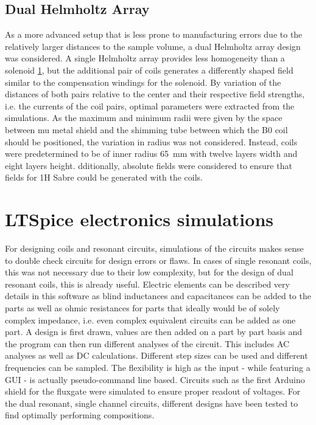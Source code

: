         \subsection{Dual Helmholtz Array}\label{simulations:DualHelmholtzArray}
        As a more advanced setup that is less prone to manufacturing errors due to the relatively larger distances to the sample volume, a dual Helmholtz array design was considered. A single Helmholtz array provides less homogeneity than a solenoid \ref{}, but the additional pair of coils generates a differently shaped field similar to the compensation windings for the solenoid. By variation of the distances of both pairs relative to the center and their respective field strengths, i.e. the currents of the coil pairs, optimal parameters were extracted from the simulations. As the maximum and minimum radii were given by the space between mu metal shield and the shimming tube between which the B0 coil should be positioned, the variation in radius was not considered. Instead, coils were predetermined to be of inner radius \SI{65}{\mm} with twelve layers width and eight layers height.
        dditionally, absolute fields were considered to ensure that fields for 1H Sabre could be generated with the coils.
    \section{LTSpice electronics simulations}
        For designing coils and resonant circuits, simulations of the circuits makes sense to double check circuits for design errors or flaws. In cases of single resonant coils, this was not necessary due to their low complexity, but for the design of dual resonant coils, this is already useful. Electric elements can be described very details in this software as blind inductances and capacitances can be added to the parts as well as ohmic resistances for parts that ideally would be of solely complex impedance, i.e. even complex equivalent circuits can be added as one part.
        A design is first drawn, values are then added on a part by part basis and the program can then run different analyses of the circuit. This includes AC analyses as well as DC calculations. Different step sizes can be used and different frequencies can be sampled. The flexibility is high as the input - while featuring a GUI - is actually pseudo-command line based. Circuits such as the first Arduino shield for the fluxgate were simulated to ensure proper readout of voltages. For the dual resonant, single channel circuits, different designs have been tested to find optimally performing compositions.
